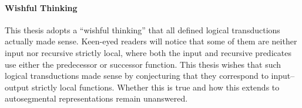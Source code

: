 \documentclass[12pt, a4paper]{report}
\begin{document}
\paragraph{Wishful Thinking}
This thesis adopts a \enquote{wishful thinking} that all defined
logical transductions actually made sense.  Keen-eyed readers will
notice that some of them are neither input nor recursive strictly
local, where both the input and recursive predicates use either the
predecessor or successor function.  This thesis wishes that such
logical transductions made sense by conjecturing that they correspond
to input--output strictly local functions.  Whether this is true and
how this extends to autosegmental representations remain unanswered.

\printbibliography[heading=bibintoc]

\printindex
\end{document}
